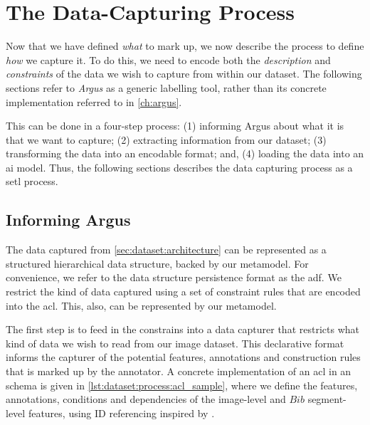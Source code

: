 \section{The Data-Capturing Process}
\label{sec:dataset:process}

Now that we have defined \textit{what} to mark up, we now describe the process to define \textit{how} we capture it. To do this, we need to encode both the \textit{description} and \textit{constraints} of the data we wish to capture from within our dataset. The following sections refer to \textit{Argus} as a generic labelling tool, rather than its concrete implementation referred to in \cref{ch:argus}.

This can be done in a four-step process: (1) informing Argus about what it is that we want to capture; (2) extracting information from our dataset; (3) transforming the data into an encodable format; and, (4) loading the data into an \gls{ai} model. Thus, the following sections describes the data capturing process as a \gls{setl} process. 

\subsection{Informing Argus}
\label{sec:dataset:process:informing}

The data captured from \cref{sec:dataset:architecture} can be represented as a structured hierarchical data structure, backed by our metamodel. For convenience, we refer to the data structure persistence format as the \gls{adf}. We restrict the kind of data captured using a set of constraint rules that are encoded into the \gls{acl}. This, also, can be represented by our metamodel.

The first step is to feed in the constrains into a data capturer that restricts what kind of data we wish to read from our image dataset. This declarative format informs the capturer of the potential features, annotations and construction rules that is marked up by the annotator. A concrete implementation of an \gls{acl} in an  schema is given in \cref{lst:dataset:process:acl_sample}, where we define the features, annotations, conditions and dependencies of the image-level and $Bib$ segment-level features, using ID referencing inspired by .

